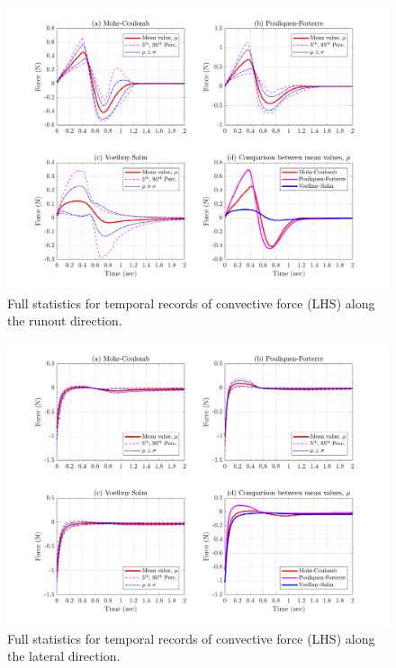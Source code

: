 \documentclass{article}
\begin{document}
\begin{figure}[H]
        \centering
        \includegraphics[width=1\textwidth]{InclinedPlane/GlobalRecords/Fconvx.png}
        \caption{Full statistics for temporal records of convective force (LHS) along the runout direction.}
        \label{fig:Ramp-Fconvx}
\end{figure}

\begin{figure}[H]
        \centering
        \includegraphics[width=1\textwidth]{InclinedPlane/GlobalRecords/Fconvy.png}
        \caption{Full statistics for temporal records of convective force (LHS) along the lateral direction.}
        \label{fig:Ramp-Fconvy}
\end{figure}
\end{document}
